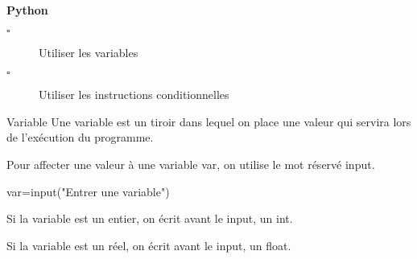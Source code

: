 \begin{titre}

\end{titre}


\begin{CpsCol}
\textbf{Python}
\begin{description}
\item[$\square$] Utiliser les variables
\item[$\square$] Utiliser les instructions conditionnelles
\end{description}
\end{CpsCol}


\begin{PC}

\end{PC}


\begin{DefT}{Variable}
Une variable est un tiroir dans lequel on place une valeur qui servira lors de l'exécution du programme.
\end{DefT}

\begin{Mt}
Pour affecter une valeur à une variable var, on utilise le mot réservé {\color{violet}input}.

var={\color{violet}input}({\color{vert}"Entrer une variable"})
\end{Mt}

\begin{Rq}
Si la variable est un entier, on écrit avant le {\color{violet}input}, un {\color{violet}int}.

Si la variable est un réel, on écrit avant le {\color{violet}input}, un {\color{violet}float}.
\end{Rq}


